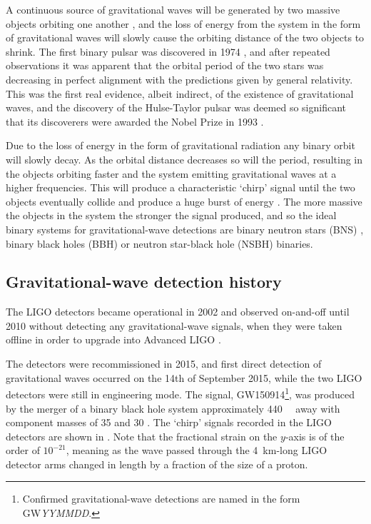 \begin{colsection}
\begin{colsection}
A continuous source of gravitational waves will be generated by two massive objects orbiting one another \citep{GW_sources}, and the loss of energy from the system in the form of gravitational waves will slowly cause the orbiting distance of the two objects to shrink. The first binary pulsar was discovered in 1974 \citep{HulseTaylor}, and after repeated observations it was apparent that the orbital period of the two stars was decreasing in perfect alignment with the predictions given by general relativity. This was the first real evidence, albeit indirect, of the existence of gravitational waves, and the discovery of the Hulse-Taylor pulsar was deemed so significant that its discoverers were awarded the Nobel Prize in 1993 \citep{HulseTaylor2}.

Due to the loss of energy in the form of gravitational radiation any binary orbit will slowly decay. As the orbital distance decreases so will the period, resulting in the objects orbiting faster and the system emitting gravitational waves at a higher frequencies. This will produce a characteristic `chirp' signal until the two objects eventually collide and produce a huge burst of energy \citep{GW_sources, BIGparis}. The more massive the objects in the system the stronger the signal produced, and so the ideal binary systems for gravitational-wave detections are binary neutron stars (BNS) , binary black holes (BBH)  or neutron star-black hole (NSBH)  binaries.

\end{colsection}


\subsection{Gravitational-wave detection history}
\label{sec:gw_detections}
\begin{colsection}

The LIGO detectors became operational in 2002 and observed on-and-off until 2010 without detecting any gravitational-wave signals, when they were taken offline in order to upgrade into Advanced LIGO \citep{LIGO_initial, LIGO_advanced}.

The detectors were recommissioned in 2015, and first direct detection of gravitational waves occurred on the 14th of September 2015, while the two LIGO detectors were still in engineering mode. The signal, GW150914\footnote{Confirmed gravitational-wave detections are named in the form GW\textit{YYMMDD}.}, was produced by the merger of a binary black hole system approximately \SI{440}{\mega\parsec} away with component masses of \SI{35}{\solarmass} and \SI{30}{\solarmass} \citep{GW150914}. The `chirp' signals recorded in the LIGO detectors are shown in . Note that the fractional strain on the $y$-axis is of the order of $10^{-21}$, meaning as the wave passed through the \SI{4}{\kilo\metre}-long LIGO detector arms changed in length by a fraction of the size of a proton.


\end{colsection}
\end{colsection}
